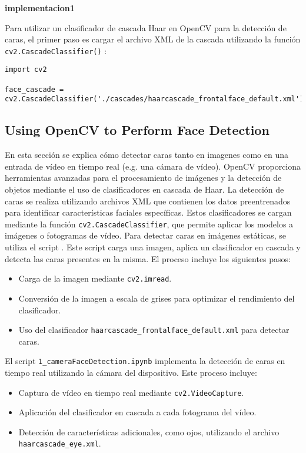 \documentclass[a4paper]{article}
\begin{document}
\textbf{implementacion1}

Para utilizar un clasificador de cascada Haar en OpenCV para la detección de caras, el primer paso es cargar el archivo XML de la cascada utilizando la función \texttt{cv2.CascadeClassifier()} :

\begin{verbatim}
import cv2

face_cascade = cv2.CascadeClassifier('./cascades/haarcascade_frontalface_default.xml')
\end{verbatim}

\subsection{Using OpenCV to Perform Face Detection}

En esta sección se explica cómo detectar caras tanto en imagenes como en una entrada de vídeo en tiempo real (e.g. una cámara de vídeo).
OpenCV proporciona herramientas avanzadas para el procesamiento de imágenes y la detección de objetos mediante el uso de clasificadores en cascada de Haar.\newline
La detección de caras se realiza utilizando archivos XML que contienen los datos preentrenados para identificar características faciales específicas. Estos clasificadores se cargan mediante la función \texttt{cv2.CascadeClassifier}, que permite aplicar los modelos a imágenes o fotogramas de vídeo.
Para detectar caras en imágenes estáticas, se utiliza el script \texttt{}. Este script carga una imagen, aplica un clasificador en cascada y detecta las caras presentes en la misma. El proceso incluye los siguientes pasos:

\begin{itemize}
    \item Carga de la imagen mediante \texttt{cv2.imread}.
    \item Conversión de la imagen a escala de grises para optimizar el rendimiento del clasificador.
    \item Uso del clasificador \texttt{haarcascade\_frontalface\_default.xml} para detectar caras.
\end{itemize}

El script \texttt{1\_cameraFaceDetection.ipynb} implementa la detección de caras en tiempo real utilizando la cámara del dispositivo. Este proceso incluye:
\begin{itemize}
    \item Captura de vídeo en tiempo real mediante \texttt{cv2.VideoCapture}.
    \item Aplicación del clasificador en cascada a cada fotograma del vídeo.
    \item Detección de características adicionales, como ojos, utilizando el archivo \texttt{haarcascade\_eye.xml}.
\end{itemize}
\end{document}
